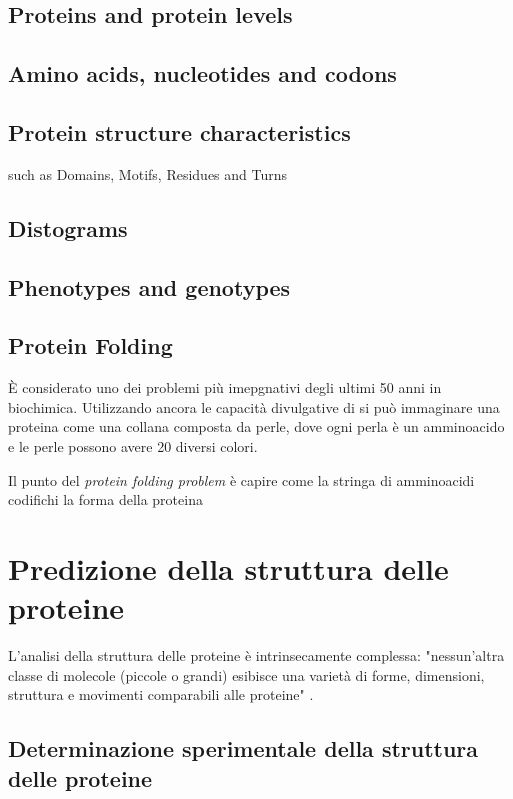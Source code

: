 \section{Proteins and protein levels}

\section{Amino acids, nucleotides and codons}

\section{Protein structure characteristics}
such as Domains, Motifs, Residues and Turns

\section{Distograms}

\section{Phenotypes and genotypes}

\section{Protein Folding}
È considerato uno dei problemi più imepgnativi degli ultimi 50 anni in biochimica.
Utilizzando ancora le capacità divulgative di \cite{TalksDill2013Oct} si può immaginare una proteina come una collana composta da perle, dove ogni perla è un amminoacido e le perle possono avere 20 diversi colori.

Il punto del \textit{protein folding problem }è capire come la stringa di amminoacidi codifichi la forma della proteina

\chapter{Predizione della struttura delle proteine}
L'analisi della struttura delle proteine è intrinsecamente complessa: "nessun'altra classe di molecole (piccole o grandi) esibisce una varietà di forme, dimensioni, struttura e movimenti comparabili alle proteine"  \parencite{baxevanis2020bioinformatics}.

\section{Determinazione sperimentale della struttura delle proteine}

